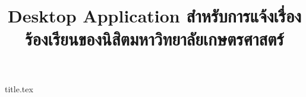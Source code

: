 \documentclass{article}
\title{%
\fontsize{32pt}{\baselineskip}\flushleft\textbf{\docsname}\\
\vspace{1ex}
\fontsize{22pt}{\baselineskip}\ourTeam\\
\vspace{3ex}
\large Desktop Application สำหรับการแจ้งเรื่องร้องเรียนของนิสิตมหาวิทยาลัยเกษตรศาสตร์}
\author{}
\date{}
\begin{document}
{title.tex}

\clearpage
\thispagestyle{empty}
\tableofcontents
\clearpage



\clearpage



\clearpage



\clearpage



\clearpage



\clearpage
\end{document}
